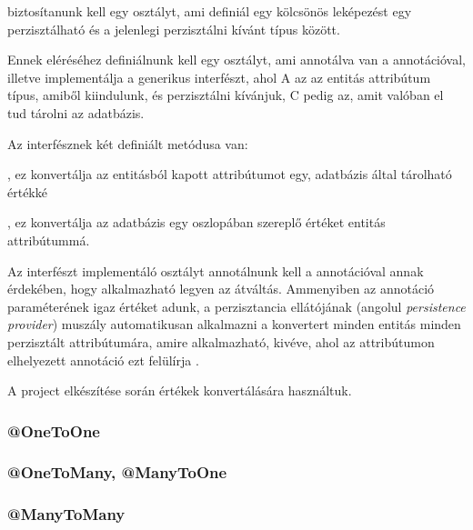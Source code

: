 \noindent biztosítanunk kell egy osztályt, ami definiál egy kölcsönös leképezést egy perzisztálható és a jelenlegi perzisztálni kívánt típus között. \par

Ennek eléréséhez definiálnunk kell egy osztályt, ami annotálva van a  annotációval, illetve implementálja a  generikus interfészt, ahol A az az entitás attribútum típus, amiből kiindulunk, és perzisztálni kívánjuk, C pedig az, amit valóban el tud tárolni az adatbázis. \par

Az  interfésznek két definiált metódusa van:

\begin{listing}
	\item {}, ez konvertálja az entitásból kapott attribútumot egy, adatbázis által tárolható értékké
	\item {}, ez konvertálja az adatbázis egy oszlopában szereplő értéket entitás attribútummá.
\end{listing}

Az interfészt implementáló osztályt annotálnunk kell a  annotációval annak érdekében, hogy alkalmazható legyen az átváltás. Ammenyiben az annotáció  paraméterének igaz értéket adunk, a perzisztancia ellátójának (angolul \emph{persistence provider}) muszály automatikusan alkalmazni a konvertert minden entitás minden perzisztált attribútumára, amire alkalmazható, kivéve, ahol az attribútumon elhelyezett  annotáció ezt felülírja \cite{converterDocumentation}.

A project elkészítése során  értékek konvertálására használtuk.


\subsubsection{@OneToOne}

\subsubsection{@OneToMany, @ManyToOne}

\subsubsection{@ManyToMany}

